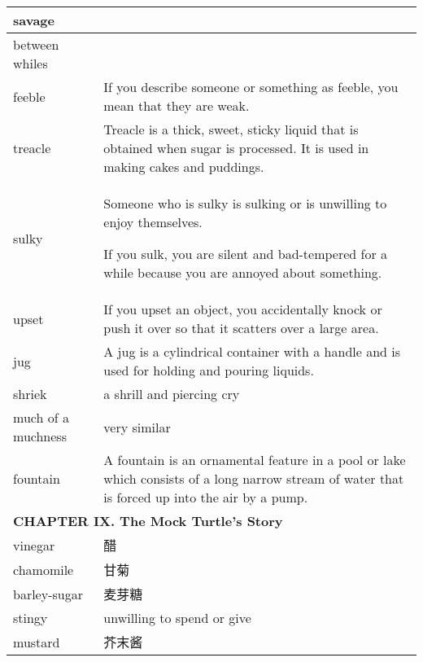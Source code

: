 \documentclass{article}
\begin{document}
\begin{center}
\begin{longtable}{|l|p{9cm}|}
\hline
savage
&

\\

\hline
between whiles
&

\\

\hline
feeble
&
If you describe someone or something as feeble, you mean that they are weak.
\\

\hline
treacle
&
Treacle is a thick, sweet, sticky liquid that is obtained when sugar is processed. It is used in making cakes and puddings.
\\

\hline
sulky
&
Someone who is sulky is sulking or is unwilling to enjoy themselves.
\par
If you sulk, you are silent and bad-tempered for a while because you are annoyed about something.
\\

\hline
upset
&
If you upset an object, you accidentally knock or push it over so that it scatters over a large area.
\\

\hline
jug
&
A jug is a cylindrical container with a handle and is used for holding and pouring liquids.
\\

\hline
shriek
&
a shrill and piercing cry
\\

\hline
much of a muchness
&
very similar
\\

\hline
fountain
&
A fountain is an ornamental feature in a pool or lake which consists of a long narrow stream of water that is forced up into the air by a pump.
\\

\hline
\multicolumn{2}{|l|}{\textbf{CHAPTER IX. The Mock Turtle’s Story}}\\

\hline
vinegar
&
醋
\\

\hline
chamomile
&
甘菊
\\

\hline
barley-sugar
&
麦芽糖
\\

\hline
stingy
&
unwilling to spend or give
\\

\hline
mustard
&
芥末酱
\\


\end{longtable}
\end{center}
\end{document}
